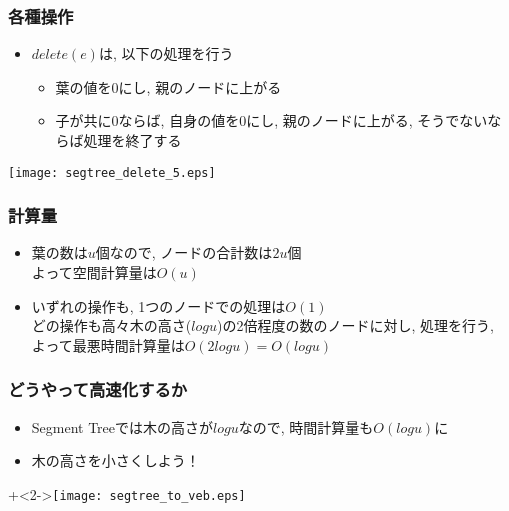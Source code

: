 \documentclass[dvipdfmx,12pt,notheorems]{beamer}
\theoremstyle{definition}
\begin{document}
\begin{frame}\frametitle{各種操作}
\begin{itemize}
\item $delete(e)$は, 以下の処理を行う
\begin{itemize}
\item 葉の値を$0$にし, 親のノードに上がる
\item 子が共に$0$ならば, 自身の値を$0$にし, 親のノードに上がる, そうでないならば処理を終了する
\end{itemize}
\end{itemize}
\texttt{[image: segtree\_delete\_5.eps]}
\end{frame}

\begin{frame}\frametitle{計算量}
\begin{itemize}
\item {}
\par \hspace{1em} 葉の数は$u$個なので, ノードの合計数は$2u$個\\よって空間計算量は$O(u)$
\item {}
\par \hspace{1em} いずれの操作も, 1つのノードでの処理は$O(1)$\\どの操作も高々木の高さ($logu$)の2倍程度の数のノードに対し, 処理を行う, よって最悪時間計算量は$O(2logu) = O(logu)$
\end{itemize}
\end{frame}

\begin{frame}\frametitle{どうやって高速化するか}
\begin{itemize}
\item Segment Treeでは木の高さが$logu$なので, 時間計算量も$O(logu)$に
\item<2-> 木の高さを小さくしよう！
\end{itemize}
\onslide+<2->{\texttt{[image: segtree\_to\_veb.eps]}}
\end{frame}
\end{document}
